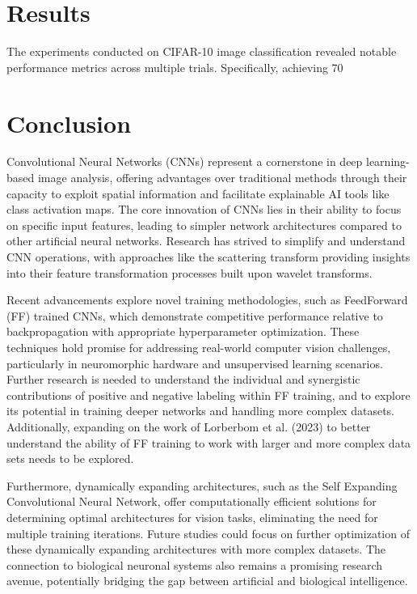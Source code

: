 \documentclass{article}
\begin{document}
\section*{Results}
The experiments conducted on CIFAR-10 image classification revealed notable performance metrics across multiple trials. Specifically, achieving 70%


\section*{Conclusion}
Convolutional Neural Networks (CNNs) represent a cornerstone in deep learning-based image analysis, offering advantages over traditional methods through their capacity to exploit spatial information and facilitate explainable AI tools like class activation maps. The core innovation of CNNs lies in their ability to focus on specific input features, leading to simpler network architectures compared to other artificial neural networks. Research has strived to simplify and understand CNN operations, with approaches like the scattering transform providing insights into their feature transformation processes built upon wavelet transforms.

Recent advancements explore novel training methodologies, such as FeedForward (FF) trained CNNs, which demonstrate competitive performance relative to backpropagation with appropriate hyperparameter optimization. These techniques hold promise for addressing real-world computer vision challenges, particularly in neuromorphic hardware and unsupervised learning scenarios. Further research is needed to understand the individual and synergistic contributions of positive and negative labeling within FF training, and to explore its potential in training deeper networks and handling more complex datasets. Additionally, expanding on the work of Lorberbom et al. (2023) to better understand the ability of FF training to work with larger and more complex data sets needs to be explored.

Furthermore, dynamically expanding architectures, such as the Self Expanding Convolutional Neural Network, offer computationally efficient solutions for determining optimal architectures for vision tasks, eliminating the need for multiple training iterations. Future studies could focus on further optimization of these dynamically expanding architectures with more complex datasets. The connection to biological neuronal systems also remains a promising research avenue, potentially bridging the gap between artificial and biological intelligence.
\end{document}
